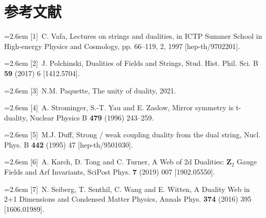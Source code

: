 

\section*{参考文献}

\par\noindent\hangindent=2.6em [1]~C. Vafa, Lectures on strings and dualities, in ICTP Summer School in High-energy Physics and Cosmology, pp. 66--119, 2, 1997 [hep-th/9702201].

\par\noindent\hangindent=2.6em [2]~J. Polchinski, Dualities of Fields and Strings, Stud. Hist. Phil. Sci. B \textbf{59} (2017) 6 [1412.5704].

\par\noindent\hangindent=2.6em [3]~N.M. Paquette, The unity of duality, 2021.

\par\noindent\hangindent=2.6em [4]~A. Strominger, S.-T. Yau and E. Zaslow, Mirror symmetry is t-duality, Nuclear Physics B \textbf{479} (1996) 243--259.

\par\noindent\hangindent=2.6em [5]~M.J. Duff, Strong / weak coupling duality from the dual string, Nucl. Phys. B \textbf{442} (1995) 47 [hep-th/9501030].

\par\noindent\hangindent=2.6em [6]~A. Karch, D. Tong and C. Turner, A Web of 2d Dualities: $\mathbf{Z}_2$ Gauge Fields and Arf Invariants, SciPost Phys. \textbf{7} (2019) 007 [1902.05550].

\par\noindent\hangindent=2.6em [7]~N. Seiberg, T. Senthil, C. Wang and E. Witten, A Duality Web in 2+1 Dimensions and Condensed Matter Physics, Annals Phys. \textbf{374} (2016) 395 [1606.01989].

